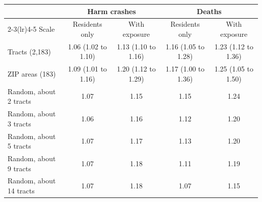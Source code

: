 \begin{tabular}{lcccc}
\toprule
 & \multicolumn{2}{c}{Harm crashes} & \multicolumn{2}{c}{Deaths} \\
\cmidrule(lr){2-3}\cmidrule(lr){4-5}
Scale & Residents only & With exposure & Residents only & With exposure \\
\midrule
Tracts (2,183) & 1.06 (1.02 to 1.10) & 1.13 (1.10 to 1.16) & 1.16 (1.05 to 1.28) & 1.23 (1.12 to 1.36) \\
ZIP areas (183) & 1.09 (1.01 to 1.16) & 1.20 (1.12 to 1.29) & 1.17 (1.00 to 1.36) & 1.25 (1.05 to 1.50) \\
Random, about 2 tracts & 1.07 & 1.15 & 1.15 & 1.24 \\
Random, about 3 tracts & 1.06 & 1.16 & 1.12 & 1.20 \\
Random, about 5 tracts & 1.07 & 1.17 & 1.13 & 1.20 \\
Random, about 9 tracts & 1.07 & 1.18 & 1.11 & 1.19 \\
Random, about 14 tracts & 1.07 & 1.18 & 1.07 & 1.15 \\
\bottomrule
\end{tabular}
